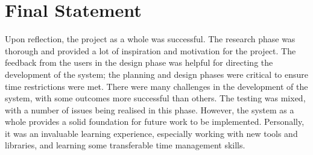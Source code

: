 \section{Final Statement}
Upon reflection, the project as a whole was successful. The research phase was thorough and provided a lot of inspiration and motivation for the project. The feedback from the users in the design phase was helpful for directing the development of the system; the planning and design phases were critical to ensure time restrictions were met. There were many challenges in the development of the system, with some outcomes more successful than others. The testing was mixed, with a number of issues being realised in this phase. However, the system as a whole provides a solid foundation for future work to be implemented. Personally, it was an invaluable learning experience, especially working with new tools and libraries, and learning some transferable time management skills.
